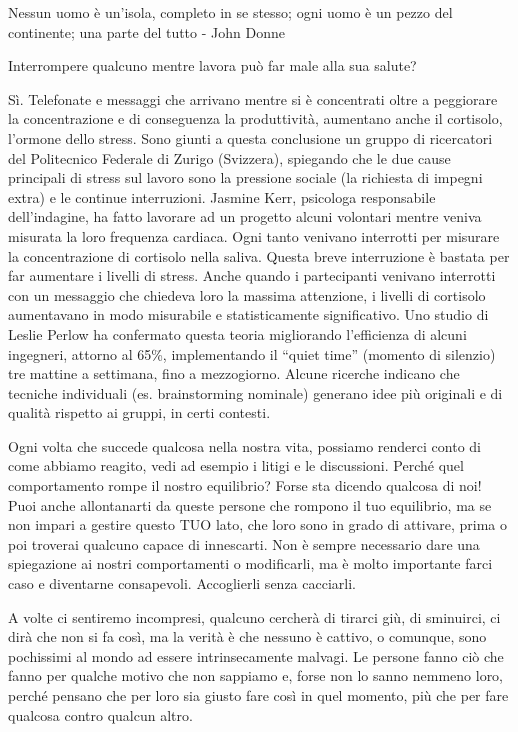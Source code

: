 \documentclass[12pt]{book} %
\begin{document}
Nessun uomo è un'isola, completo in se stesso; ogni uomo è un pezzo del continente; una parte del tutto - John Donne 

\begin{mdframed}[linewidth=1pt]
Interrompere qualcuno mentre lavora può far male alla sua salute?

Sì. Telefonate e messaggi che arrivano mentre si è concentrati oltre a peggiorare la concentrazione e di conseguenza la
produttività, aumentano anche il cortisolo, l'ormone dello stress. Sono giunti a questa conclusione un gruppo di
ricercatori del Politecnico Federale di Zurigo (Svizzera), spiegando che le due cause principali di stress sul lavoro
sono la pressione sociale (la richiesta di impegni extra) e le continue interruzioni. Jasmine Kerr, psicologa
responsabile dell'indagine, ha fatto lavorare ad un progetto alcuni volontari mentre veniva misurata la loro frequenza
cardiaca. Ogni tanto venivano interrotti per misurare la concentrazione di cortisolo nella saliva. Questa breve
interruzione è bastata per far aumentare i livelli di stress. Anche quando i partecipanti venivano interrotti con un
messaggio che chiedeva loro la massima attenzione, i livelli di cortisolo aumentavano in modo misurabile e statisticamente significativo. Uno studio di Leslie
Perlow ha confermato questa teoria migliorando l'efficienza di alcuni ingegneri, attorno al 65\%, implementando il “quiet time” (momento di silenzio) tre mattine a settimana, fino a mezzogiorno. Alcune ricerche indicano che tecniche individuali (es. brainstorming nominale) generano idee più originali e di qualità rispetto ai gruppi, in certi contesti.
\end{mdframed}

Ogni volta che succede qualcosa nella nostra vita, possiamo
renderci conto di come abbiamo reagito, vedi ad esempio i litigi e le discussioni. Perché quel comportamento rompe il
nostro equilibrio? Forse sta dicendo qualcosa di noi! Puoi anche allontanarti da queste persone che rompono il tuo
equilibrio, ma se non impari a gestire questo TUO lato, che loro sono in grado di attivare, prima o poi troverai qualcuno capace di innescarti. Non è sempre necessario dare una spiegazione ai nostri
comportamenti o modificarli, ma è molto importante farci caso e diventarne consapevoli. Accoglierli senza cacciarli.

A volte ci sentiremo incompresi, qualcuno cercherà di tirarci giù, di sminuirci, ci dirà che non si fa così, ma la
verità è che nessuno è cattivo, o comunque, sono pochissimi al mondo ad essere intrinsecamente malvagi. Le persone
fanno ciò che fanno per qualche motivo che non sappiamo e, forse non lo sanno nemmeno loro, perché pensano che per loro
sia giusto fare così in quel momento, più che per fare qualcosa contro qualcun altro.
\end{document}
